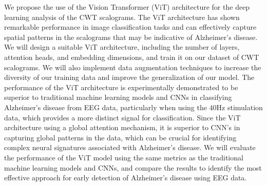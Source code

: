 \documentclass[openany]{book}
\begin{document}
We propose the use of the Vision Transformer (ViT) architecture for the deep learning analysis of the CWT scalograms. The ViT architecture has shown remarkable performance in image classification tasks and can effectively capture spatial patterns in the scalograms that may be indicative of Alzheimer's disease. We will design a suitable ViT architecture, including the number of layers, attention heads, and embedding dimensions, and train it on our dataset of CWT scalograms. We will also implement data augmentation techniques to increase the diversity of our training data and improve the generalization of our model. The performance of the ViT architecture is experimentally demonstrated to be superior to traditional machine learning models and CNNs in classifying Alzheimer's disease from EEG data, particularly when using the 40Hz stimulation data, which provides a more distinct signal for classification. Since the ViT architecture using a global attention mechanism, it is superior to CNN's in capturing global patterns in the data, which can be crucial for identifying complex neural signatures associated with Alzheimer's disease. We will evaluate the performance of the ViT model using the same metrics as the traditional machine learning models and CNNs, and compare the results to identify the most effective approach for early detection of Alzheimer's disease using EEG data. \\
\end{document}
